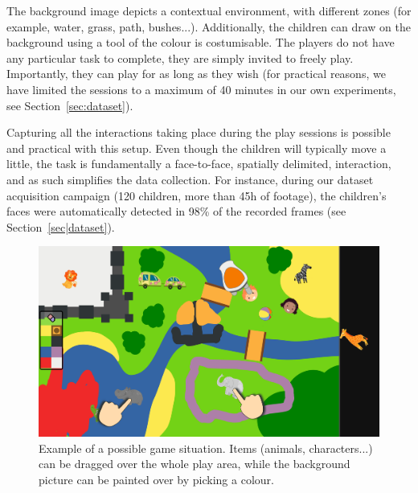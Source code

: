 \documentclass[sigconf]{acmart}
\begin{document}
The background image depicts a contextual environment, with different 
zones (for example, water, grass, path, bushes...). Additionally, the children can draw on
the background using a tool of the colour is costumisable. The players do
not have any particular task to complete, they are simply invited to freely
play. Importantly, they can play for as long as they wish (for
practical reasons, we have limited the sessions to a maximum of 40 minutes in
our own experiments, see Section~\ref{sec:dataset}).

Capturing all the interactions taking place during the play sessions is possible
and practical with this setup. Even though the children will typically move a
little, the task is fundamentally a face-to-face, spatially delimited,
interaction, and as such simplifies the data collection. For instance, during
our dataset acquisition campaign (120 children, more than 45h of footage), the
children's faces were automatically detected in 98\% of the recorded frames (see
Section~\ref{sec|dataset}).



\begin{figure}[ht!]
    \centering
    \includegraphics[width=0.9\columnwidth]{sandbox}
    \caption{Example of a possible game situation. Items (animals,
    characters...) can be dragged over the whole play area, while the background
    picture can be painted over by picking a colour.}

    \label{fig|sandbox}
\end{figure}

%
\end{document}
